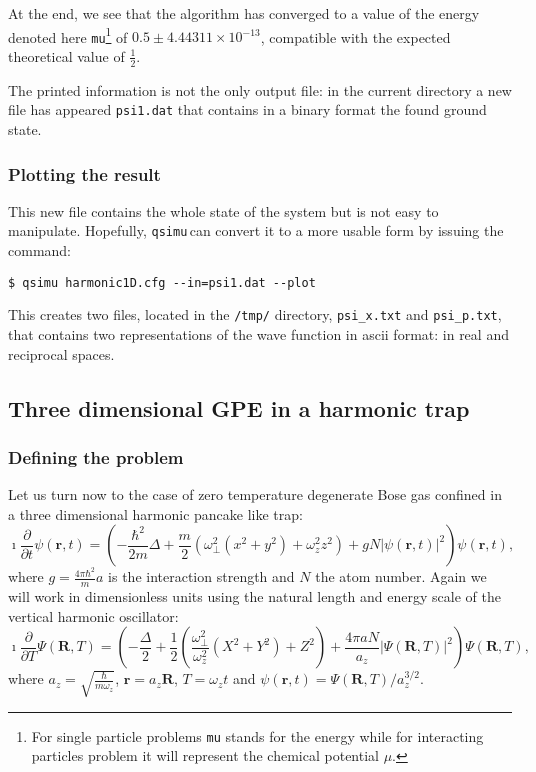 \documentclass[12pt,a4paper]{report}
\newcommand{\abs}[1]{\left|#1\right|}
\newcommand{\qsimu}{\texttt{qsimu}\,}
\begin{document}
At the end, we see that the algorithm has converged to a value of the energy denoted here \texttt{mu}\footnote{For single particle problems \texttt{mu} stands for the energy while for interacting particles problem it will represent the chemical potential $\mu$.} of $0.5\pm4.44311\times10^{-13}$, compatible with the expected theoretical value of $\frac{1}{2}$.

The printed information is not the only output file: in the current directory a new file has appeared \texttt{psi1.dat} that contains in a binary format the found ground state.

\subsubsection{Plotting the result}
This new file contains the whole state of the system but is not easy to manipulate.
Hopefully, \qsimu can convert it to a more usable form by issuing the command:
\begin{verbatim}
$ qsimu harmonic1D.cfg --in=psi1.dat --plot
\end{verbatim}
This creates two files, located in the \texttt{/tmp/} directory, \texttt{psi\_x.txt} and \texttt{psi\_p.txt}, that contains two representations of the wave function in ascii format: in real and reciprocal spaces.


\subsection{Three dimensional GPE in a harmonic trap}
\subsubsection{Defining the problem}
Let us turn now to the case of zero temperature degenerate Bose gas confined in a three dimensional harmonic pancake like trap:
\begin{equation}
\imath\frac{\partial}{\partial t}\psi(\bm{r},t)=
\left(-\frac{\hbar^2}{2m}\Delta+\frac{m}{2}(\omega_\perp^2(x^2+y^2)+\omega_z^2z^2)
+gN\abs{\psi(\bm{r},t)}^2\right)\psi(\bm{r},t),
\end{equation}
where $g=\frac{4\pi\hbar^2}{m}a$ is the interaction strength and $N$ the atom number.
Again we will work in dimensionless units using the natural length and energy scale of the vertical harmonic oscillator:
\begin{equation}
\imath\frac{\partial}{\partial T}\Psi(\bm{R},T)=\left(-\frac{\Delta}{2}
+\frac{1}{2}\left(\frac{\omega_\perp^2}{\omega_z^2}(X^2+Y^2)+Z^2\right)
+\frac{4\pi aN}{a_z}\abs{\Psi(\bm{R},T)}^2\right)\Psi(\bm{R},T),
\label{eqn:3dlgpe}
\end{equation}
where $a_z=\sqrt{\frac{\hbar}{m\omega_z}}$, $\bm{r}=a_z\bm{R}$, $T=\omega_zt$ and $\psi(\bm{r},t)=\Psi(\bm{R},T)/a_z^{3/2}$.
\end{document}
